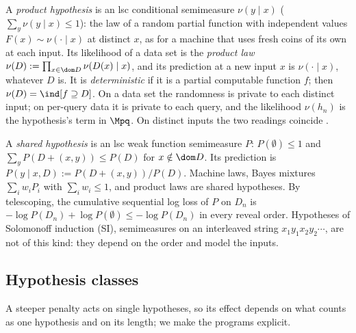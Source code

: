 \begin{definition}\label{def:setup:product}
A \emph{product hypothesis} is an lsc conditional semimeasure $\nu(y\mid x)$ ($\sum_y\nu(y\mid x)\le1$): the law of a random partial function with independent values $F(x)\sim\nu(\cdot\mid x)$ at distinct $x$, as for a machine that uses fresh coins of its own at each input. Its likelihood of a data set is the \emph{product law} $\nu(D):=\prod_{x\in\dom D}\nu(D(x)\mid x)$, and its prediction at a new input $x$ is $\nu(\cdot\mid x)$, whatever $D$ is. It is \emph{deterministic} if it is a partial computable function $f$; then $\nu(D)=\ind[f\supseteq D]$. On a data set the randomness is private to each distinct input; on per-query data it is private to each query, and the likelihood $\nu(h_n)$ is the hypothesis's term in $\Mpq$. On distinct inputs the two readings coincide \citep[Proposition~5.7(a)]{claudeSFI2026fundamentals}.%
\end{definition}

\begin{definition}\label{def:setup:shared}
A \emph{shared hypothesis} is an lsc weak function semimeasure $P$: $P(\emptyset)\le1$ and $\sum_yP(D+(x,y))\le P(D)$ for $x\notin\dom D$. Its prediction is $P(y\mid x,D):=P(D+(x,y))/P(D)$. Machine laws, Bayes mixtures $\sum_iw_iP_i$ with $\sum_iw_i\le1$, and product laws are shared hypotheses. By telescoping, the cumulative sequential log loss of $P$ on $D_n$ is $-\log P(D_n)+\log P(\emptyset)\le-\log P(D_n)$ in every reveal order. Hypotheses of Solomonoff induction (SI), semimeasures on an interleaved string $x_1y_1x_2y_2\cdots$, are not of this kind: they depend on the order and model the inputs.
\end{definition}

\subsection{Hypothesis classes}\label{sec:setup:classes}

A steeper penalty acts on single hypotheses, so its effect depends on what counts as one hypothesis and on its length; we make the programs explicit.

